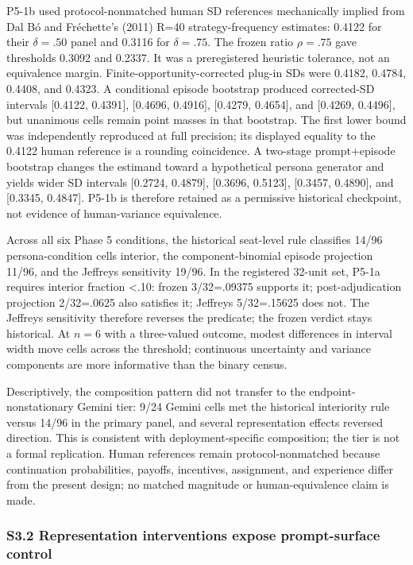 \documentclass[11pt]{article}
\begin{document}
P5-1b used protocol-nonmatched human SD references mechanically implied
from Dal Bó and Fréchette's (2011) R=40 strategy-frequency estimates:
0.4122 for their \(\delta=.50\) panel and 0.3116 for \(\delta=.75\). The
frozen ratio \(\rho=.75\) gave thresholds 0.3092 and 0.2337. It was a
preregistered heuristic tolerance, not an equivalence margin.
Finite-opportunity-corrected plug-in SDs were 0.4182, 0.4784, 0.4408,
and 0.4323. A conditional episode bootstrap produced corrected-SD
intervals {[}0.4122, 0.4391{]}, {[}0.4696, 0.4916{]}, {[}0.4279,
0.4654{]}, and {[}0.4269, 0.4496{]}, but unanimous cells remain point
masses in that bootstrap. The first lower bound was independently
reproduced at full precision; its displayed equality to the 0.4122 human
reference is a rounding coincidence. A two-stage prompt+episode
bootstrap changes the estimand toward a hypothetical persona generator
and yields wider SD intervals {[}0.2724, 0.4879{]}, {[}0.3696,
0.5123{]}, {[}0.3457, 0.4890{]}, and {[}0.3345, 0.4847{]}. P5-1b is
therefore retained as a permissive historical checkpoint, not evidence
of human-variance equivalence.

Across all six Phase 5 conditions, the historical seat-level rule
classifies 14/96 persona-condition cells interior, the
component-binomial episode projection 11/96, and the Jeffreys
sensitivity 19/96. In the registered 32-unit set, P5-1a requires
interior fraction \textless.10: frozen 3/32=.09375 supports it;
post-adjudication projection 2/32=.0625 also satisfies it; Jeffreys
5/32=.15625 does not. The Jeffreys sensitivity therefore reverses the
predicate; the frozen verdict stays historical. At \(n=6\) with a
three-valued outcome, modest differences in interval width move cells
across the threshold; continuous uncertainty and variance components are
more informative than the binary census.

Descriptively, the composition pattern did not transfer to the
endpoint-nonstationary Gemini tier: 9/24 Gemini cells met the historical
interiority rule versus 14/96 in the primary panel, and several
representation effects reversed direction. This is consistent with
deployment-specific composition; the tier is not a formal replication.
Human references remain protocol-nonmatched because continuation
probabilities, payoffs, incentives, assignment, and experience differ
from the present design; no matched magnitude or human-equivalence claim
is made.

\subsubsection{S3.2 Representation interventions expose prompt-surface
control}\label{s3.2-representation-interventions-expose-prompt-surface-control}
\end{document}
